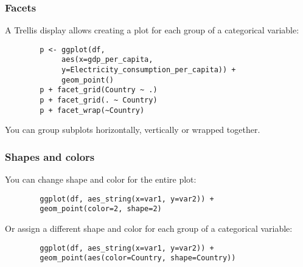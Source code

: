 \documentclass{beamer}
\begin{document}
	\begin{frame}[fragile]
		\frametitle{Facets}

		A Trellis display allows creating a plot for each group of a categorical variable:

		\begin{exampleblock}{}
		\begin{center}
		\begin{BVerbatim}
		p <- ggplot(df,
		     aes(x=gdp_per_capita,
		     y=Electricity_consumption_per_capita)) +
		     geom_point()
		p + facet_grid(Country ~ .)
		p + facet_grid(. ~ Country)
		p + facet_wrap(~Country)
		\end{BVerbatim}
		\end{center}
		\end{exampleblock}{}

		You can group subplots horizontally, vertically or wrapped together.

	\end{frame}

	\begin{frame}[fragile]
		\frametitle{Shapes and colors}

		You can change shape and color for the entire plot:

		\begin{exampleblock}{}
		\begin{center}
		\begin{BVerbatim}
		ggplot(df, aes_string(x=var1, y=var2)) +
		geom_point(color=2, shape=2)
		\end{BVerbatim}
		\end{center}
		\end{exampleblock}{}

		Or assign a different shape and color for each group of a categorical variable:

		\begin{exampleblock}{}
		\begin{center}
		\begin{BVerbatim}
		ggplot(df, aes_string(x=var1, y=var2)) +
		geom_point(aes(color=Country, shape=Country))
		\end{BVerbatim}
		\end{center}
		\end{exampleblock}{}

	\end{frame}
\end{document}
